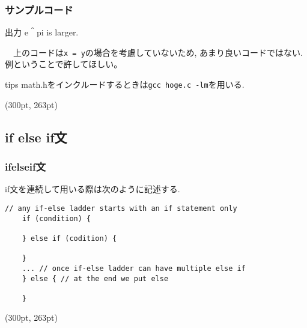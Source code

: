 \documentclass[dvipdfmx]{beamer}
\begin{document}
\begin{frame}[label=35]
    \frametitle{サンプルコード}
    \begin{block}{出力}
        e＾pi is larger.
    \end{block}
    　上のコードは\texttt{x = y}の場合を考慮していないため,
    あまり良いコードではない.例ということで許してほしい。
    \begin{itembox}[l]{tips}
    math.hをインクルードするときは\texttt{gcc hoge.c -lm}を用いる.
    \end{itembox}
    \begin{textblock*}{0.3\linewidth}(300pt, 263pt)
    \hyperlink{34}{}
    \space
    \hyperlink{36}{}
    \end{textblock*}
\end{frame}

\subsection{if else if文}
\begin{frame}[t, fragile, label=36]
    \frametitle{if\space else\space if文}
    if文を連続して用いる際は次のように記述する.
    \begin{lstlisting}[gobble=3, caption=Syntax\space of\space if-else-if, label=if_howto]
    // any if-else ladder starts with an if statement only
    if (condition) {
    
    } else if (codition) {
    
    }
    ... // once if-else ladder can have multiple else if
    } else { // at the end we put else

    }
    \end{lstlisting}
    \begin{textblock*}{0.3\linewidth}(300pt, 263pt)
    \hyperlink{35}{}
    \space
    \hyperlink{37}{}
    \end{textblock*}
\end{frame}
\end{document}
